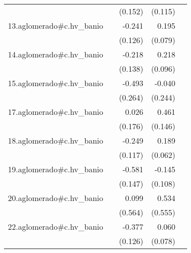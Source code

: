 {\begin{longtable}{l*{4}{D{.}{.}{-1}}}
            &                     &     (0.152)         &     (0.115)         &                     \\
\addlinespace
13.aglomerado#c.hv\_banio&                     &      -0.241         &       0.195\sym{*}  &                     \\
            &                     &     (0.126)         &     (0.079)         &                     \\
\addlinespace
14.aglomerado#c.hv\_banio&                     &      -0.218         &       0.218\sym{*}  &                     \\
            &                     &     (0.138)         &     (0.096)         &                     \\
\addlinespace
15.aglomerado#c.hv\_banio&                     &      -0.493         &      -0.040         &                     \\
            &                     &     (0.264)         &     (0.244)         &                     \\
\addlinespace
17.aglomerado#c.hv\_banio&                     &       0.026         &       0.461\sym{**} &                     \\
            &                     &     (0.176)         &     (0.146)         &                     \\
\addlinespace
18.aglomerado#c.hv\_banio&                     &      -0.249\sym{*}  &       0.189\sym{**} &                     \\
            &                     &     (0.117)         &     (0.062)         &                     \\
\addlinespace
19.aglomerado#c.hv\_banio&                     &      -0.581\sym{***}&      -0.145         &                     \\
            &                     &     (0.147)         &     (0.108)         &                     \\
\addlinespace
20.aglomerado#c.hv\_banio&                     &       0.099         &       0.534         &                     \\
            &                     &     (0.564)         &     (0.555)         &                     \\
\addlinespace
22.aglomerado#c.hv\_banio&                     &      -0.377\sym{**} &       0.060         &                     \\
            &                     &     (0.126)         &     (0.078)         &                     \\

\end{longtable}}
